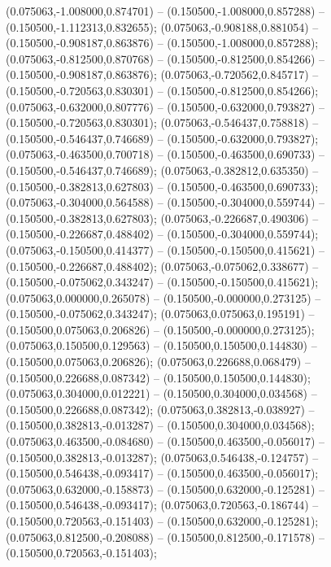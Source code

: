  (0.075063,-1.008000,0.874701) -- (0.150500,-1.008000,0.857288) -- (0.150500,-1.112313,0.832655);
 (0.075063,-0.908188,0.881054) -- (0.150500,-0.908187,0.863876) -- (0.150500,-1.008000,0.857288);
 (0.075063,-0.812500,0.870768) -- (0.150500,-0.812500,0.854266) -- (0.150500,-0.908187,0.863876);
 (0.075063,-0.720562,0.845717) -- (0.150500,-0.720563,0.830301) -- (0.150500,-0.812500,0.854266);
 (0.075063,-0.632000,0.807776) -- (0.150500,-0.632000,0.793827) -- (0.150500,-0.720563,0.830301);
 (0.075063,-0.546437,0.758818) -- (0.150500,-0.546437,0.746689) -- (0.150500,-0.632000,0.793827);
 (0.075063,-0.463500,0.700718) -- (0.150500,-0.463500,0.690733) -- (0.150500,-0.546437,0.746689);
 (0.075063,-0.382812,0.635350) -- (0.150500,-0.382813,0.627803) -- (0.150500,-0.463500,0.690733);
 (0.075063,-0.304000,0.564588) -- (0.150500,-0.304000,0.559744) -- (0.150500,-0.382813,0.627803);
 (0.075063,-0.226687,0.490306) -- (0.150500,-0.226687,0.488402) -- (0.150500,-0.304000,0.559744);
 (0.075063,-0.150500,0.414377) -- (0.150500,-0.150500,0.415621) -- (0.150500,-0.226687,0.488402);
 (0.075063,-0.075062,0.338677) -- (0.150500,-0.075062,0.343247) -- (0.150500,-0.150500,0.415621);
 (0.075063,0.000000,0.265078) -- (0.150500,-0.000000,0.273125) -- (0.150500,-0.075062,0.343247);
 (0.075063,0.075063,0.195191) -- (0.150500,0.075063,0.206826) -- (0.150500,-0.000000,0.273125);
 (0.075063,0.150500,0.129563) -- (0.150500,0.150500,0.144830) -- (0.150500,0.075063,0.206826);
 (0.075063,0.226688,0.068479) -- (0.150500,0.226688,0.087342) -- (0.150500,0.150500,0.144830);
 (0.075063,0.304000,0.012221) -- (0.150500,0.304000,0.034568) -- (0.150500,0.226688,0.087342);
 (0.075063,0.382813,-0.038927) -- (0.150500,0.382813,-0.013287) -- (0.150500,0.304000,0.034568);
 (0.075063,0.463500,-0.084680) -- (0.150500,0.463500,-0.056017) -- (0.150500,0.382813,-0.013287);
 (0.075063,0.546438,-0.124757) -- (0.150500,0.546438,-0.093417) -- (0.150500,0.463500,-0.056017);
 (0.075063,0.632000,-0.158873) -- (0.150500,0.632000,-0.125281) -- (0.150500,0.546438,-0.093417);
 (0.075063,0.720563,-0.186744) -- (0.150500,0.720563,-0.151403) -- (0.150500,0.632000,-0.125281);
 (0.075063,0.812500,-0.208088) -- (0.150500,0.812500,-0.171578) -- (0.150500,0.720563,-0.151403);
